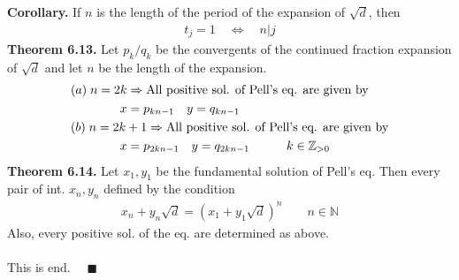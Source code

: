 \documentclass[a4paper,10pt]{article}
\begin{document}
\textbf{Corollary.} If $n$ is the length of the period of the expansion of $\sqrt{d}$, then
\begin{align}
t_{j}=1 \quad \Longleftrightarrow \quad n|j
\end{align}
\textbf{Theorem 6.13.} Let $p_{k}/q_{k}$ be the convergents of the continued fraction expansion of $\sqrt{d}$ and let $n$ be the length of the expansion.
\begin{align}
&(a) \; n=2k \Rightarrow \textnormal{All positive sol. of Pell's eq. are given by} \\
& \quad \quad \quad \quad x=p_{kn-1} \quad y=q_{kn-1} \\
&(b) \; n=2k+1 \Rightarrow \textnormal{All positive sol. of Pell's eq. are given by} \\
& \quad \quad \quad \quad x=p_{2kn-1} \quad y=q_{2kn-1} \quad \quad \quad k\in\mathbb{Z}_{>0}
\end{align}
\textbf{Theorem 6.14.} Let $x_{1}, y_{1}$ be the fundamental solution of Pell's eq. Then every pair of int. $x_{n}, y_{n}$ defined by the condition
\begin{align}
x_{n}+y_{n}\sqrt{d}=(x_{1}+y_{1}\sqrt{d})^{n} \quad \quad n\in\mathbb{N}
\end{align}
Also, every positive sol. of the eq. are determined as above. \\ \\
This is end. $\quad\blacksquare$
\end{document}
